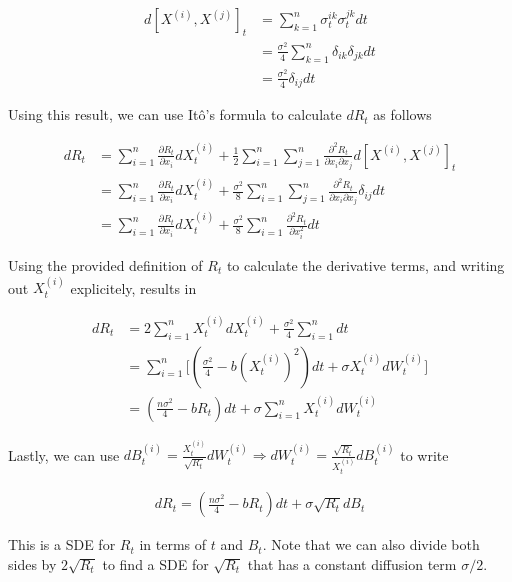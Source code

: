 \documentclass[12pt, a4paper]{article}
\begin{document}
\begin{enumerate}
    \begin{align*}
        d[X^{(i)}, X^{(j)}]_t &= \sum_{k=1}^n \sigma_t^{ik} \sigma_t^{jk} dt \\
        &= \frac{\sigma^2}{4} \sum_{k=1}^n \delta_{ik} \delta_{jk} dt\\
        &= \frac{\sigma^2}{4} \delta_{ij} dt
    \end{align*}

    Using this result, we can use Itô's formula to calculate $dR_t$ as follows

    \begin{align*}
        dR_t &= \sum_{i=1}^n \frac{\partial R_t}{\partial x_i} dX_t^{(i)} + \frac{1}{2} \sum_{i=1}^n \sum_{j=1}^n \frac{\partial^2 R_t}{\partial x_i \partial x_j} d[X^{(i)}, X^{(j)}]_t\\
        &= \sum_{i=1}^n \frac{\partial R_t}{\partial x_i} dX_t^{(i)} + \frac{\sigma^2}{8} \sum_{i=1}^n \sum_{j=1}^n \frac{\partial^2 R_t}{\partial x_i \partial x_j} \delta_{ij} dt\\
        &= \sum_{i=1}^n \frac{\partial R_t}{\partial x_i} dX_t^{(i)} + \frac{\sigma^2}{8} \sum_{i=1}^n \frac{\partial^2 R_t}{\partial x_i^2} dt
    \end{align*}

    Using the provided definition of $R_t$ to calculate the derivative terms, and writing out $X_t^{(i)}$ explicitely, results in

    \begin{align*}
        dR_t &= 2\sum_{i=1}^n X_t^{(i)}dX_t^{(i)} + \frac{\sigma^2}{4} \sum_{i=1}^n dt \\
        &= \sum_{i=1}^n \Big[ \left( \frac{\sigma^2}{4}-b \left(X_t^{(i)}\right)^2 \right)dt + \sigma X_t^{(i)} dW_t^{(i)}  \Big] \\
        &= \left(\frac{n\sigma^2}{4} - b R_t\right) dt + \sigma \sum_{i=1}^n X_t^{(i)}dW_t^{(i)}
    \end{align*}

    Lastly, we can use $dB_t^{(i)} = \frac{X_t^{(i)}}{\sqrt{R_t}}dW_t^{(i)} \Rightarrow dW_t^{(i)} = \frac{\sqrt{R_t}}{X_t^{(i)}}dB_t^{(i)}$ to write 

    \begin{align*}
        dR_t = \left(\frac{n\sigma^2}{4} - b R_t\right) dt + \sigma \sqrt{R_t} dB_t
    \end{align*}

    This is a SDE for $R_t$ in terms of $t$ and $B_t$. Note that we can also divide both sides by $2\sqrt{R_t}$ to find a SDE for $\sqrt{R_t}$ that has a constant diffusion term $\sigma/2$.



\end{enumerate}
\end{document}
